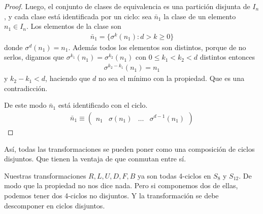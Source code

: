 \documentclass{article}
\theoremstyle{definition}
\begin{document}
\begin{proof}
    Luego, el conjunto de clases de equivalencia es una partición disjunta de $I_n$, y cada clase está identificada por un ciclo: sea $\bar{n}_1$ la clase de un elemento $n_1\in I_n$. Los elementos de la clase son
    \begin{align*}
        \bar{n}_1=\{\sigma^k(n_1):d>k\geq 0\}
    \end{align*}
    donde $\sigma^d(n_1)=n_1$. Además todos los elementos son distintos, porque de no serlos, digamos que $\sigma^{k_1}(n_1)=\sigma^{k_2}(n_1)$ con $0\leq k_1<k_2< d$ distintos entonces
    \begin{align*}
        \sigma^{k_2-k_1}(n_1)=n_1
    \end{align*}
    y $k_2-k_1<d$, haciendo que $d$ no sea el mínimo con la propiedad. Que es una contradicción.

    De este modo $\bar{n}_1$ está identificado con el ciclo.
    \begin{align*}
        \bar{n}_1\equiv \begin{pmatrix}
                            n_1 & \sigma(n_1) & \dots & \sigma^{d-1}(n_1)
                        \end{pmatrix}
    \end{align*}
\end{proof}
Así, todas las transformaciones se pueden poner como una composición de ciclos disjuntos. Que tienen la ventaja de que conmutan entre sí.

Nuestras transformaciones $R,L,U,D,F,B$ ya son todas 4-ciclos en $S_{8}$ y $S_{12}$. De modo que la propiedad no nos dice nada. Pero si componemos dos de ellas, podemos tener dos 4-ciclos no disjuntos. Y la transformación se debe descomponer en ciclos disjuntos.
\end{document}
